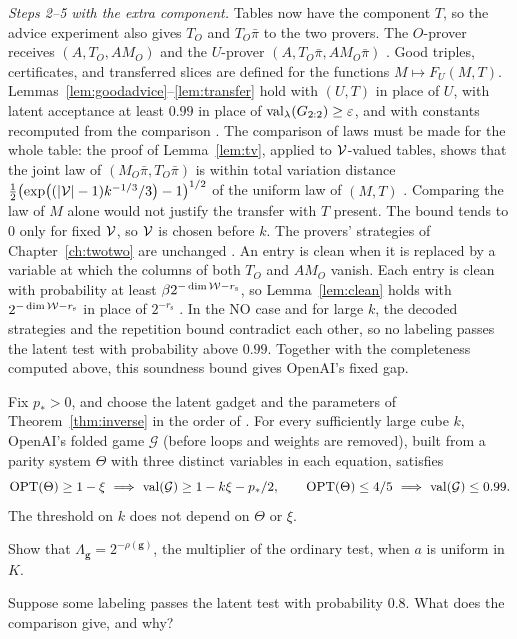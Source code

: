\emph{Steps 2--5 with the extra component.} Tables now have the component $T$, so the advice experiment also gives $T_O$ and $T_O\bar\pi$ to the two provers. The $O$-prover receives $(A,T_O,AM_O)$ and the $U$-prover $(A,T_O\bar\pi,AM_O\bar\pi)$ \cite[Definition~5.2]{OAI}. Good triples, certificates, and transferred slices are defined for the functions $M\mapsto F_U(M,T)$. Lemmas~\ref{lem:goodadvice}--\ref{lem:transfer} hold with $(U,T)$ in place of $U$, with latent acceptance at least $0.99$ in place of $\operatorname{val}_\lambda(G_{2:2})\ge\varepsilon$, and with constants recomputed from the comparison \cite[Lemmas~5.5--5.7]{OAI}. The comparison of laws must be made for the whole table: the proof of Lemma~\ref{lem:tv}, applied to $\mathcal{V}$-valued tables, shows that the joint law of $(M_O\bar\pi,T_O\bar\pi)$ is within total variation distance $\tfrac12\bigl(\exp\bigl((|\mathcal{V}|-1)k^{-1/3}/3\bigr)-1\bigr)^{1/2}$ of the uniform law of $(M,T)$ \cite[Lemma~5.6]{OAI}. Comparing the law of $M$ alone would not justify the transfer with $T$ present. The bound tends to $0$ only for fixed $\mathcal{V}$, so $\mathcal{V}$ is chosen before $k$. The provers' strategies of Chapter~\ref{ch:twotwo} are unchanged \cite[Proposition~5.3]{OAI}. An entry is clean when it is replaced by a variable at which the columns of both $T_O$ and $AM_O$ vanish. Each entry is clean with probability at least $\beta2^{-\dim\mathcal{W}-r_{\mathrm s}}$, so Lemma~\ref{lem:clean} holds with $2^{-\dim\mathcal{W}-r_{\mathrm s}}$ in place of $2^{-r_{\mathrm s}}$ \cite[Lemma~6.2]{OAI}. In the NO case and for large $k$, the decoded strategies and the repetition bound contradict each other, so no labeling passes the latent test with probability above $0.99$. Together with the completeness computed above, this soundness bound gives OpenAI's fixed gap.

\begin{proposition}\label{prop:latentgap}
Fix $p_*>0$, and choose the latent gadget and the parameters of Theorem~\ref{thm:inverse} in the order of \cite[Equation~(5.4)]{OAI}. For every sufficiently large cube $k$, OpenAI's folded game $\mathcal G$ (before loops and weights are removed), built from a parity system $\Theta$ with three distinct variables in each equation, satisfies
\[
\OPT(\Theta)\ge1-\xi\ \Longrightarrow\ \val(\mathcal G)\ge1-k\xi-p_*/2,\qquad\OPT(\Theta)\le4/5\ \Longrightarrow\ \val(\mathcal G)\le0.99.
\]
The threshold on $k$ does not depend on $\Theta$ or $\xi$.
\end{proposition}

\chapterquestions
\begin{question}\label{q:mu}
Show that $\Lambda_{\boldsymbol g}=2^{-\rho(\boldsymbol g)}$, the multiplier of the ordinary test, when $a$ is uniform in $K$.
\end{question}

\begin{question}\label{q:point8}
Suppose some labeling passes the latent test with probability $0.8$. What does the comparison give, and why?
\end{question}
